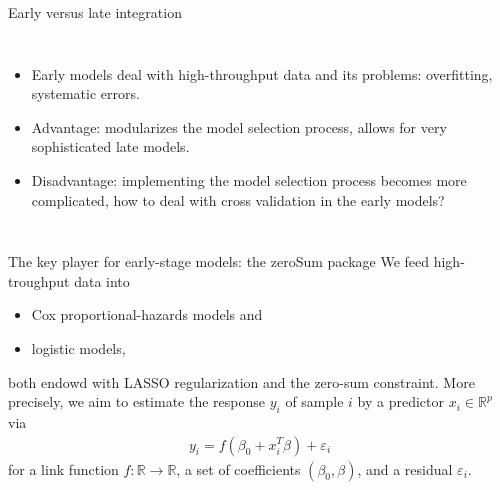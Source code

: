 \documentclass[10pt, aspectratio=169]{beamer}
\begin{document}
\begin{frame}{Early versus \alert{late} integration}
  \begin{columns}
      \centering
      \begin{itemize}
        \item Early models deal with high-throughput data and its problems: overfitting, 
          systematic errors.
        \item Advantage: modularizes the model selection process, allows for very
          sophisticated late models.
        \item Disadvantage: implementing the model selection process becomes more 
          complicated, how to deal with cross validation in the early models?
      \end{itemize}
  \end{columns}
\end{frame}

\begin{frame}{The key player for early-stage models: the zeroSum package}
  We feed high-troughput data into 

  \begin{itemize}
    \item \alert{Cox} proportional-hazards models and
    \item \alert{logistic} models,
  \end{itemize}

  both endowd with \alert{LASSO} regularization and the \alert{zero-sum} constraint. More precisely, we 
  aim to estimate the response $y_i$ of sample $i$ by a predictor $x_i \in \mathbb{R}^p$ via 
  \begin{align}
    y_i = f(\beta_0 + x_i^T \beta) + \varepsilon_i
  \end{align}
  for a link function $f: \mathbb{R} \to \mathbb{R}$, a set of coefficients $(\beta_0, 
  \beta)$, and a residual $\varepsilon_i$.
\end{frame}
\end{document}
